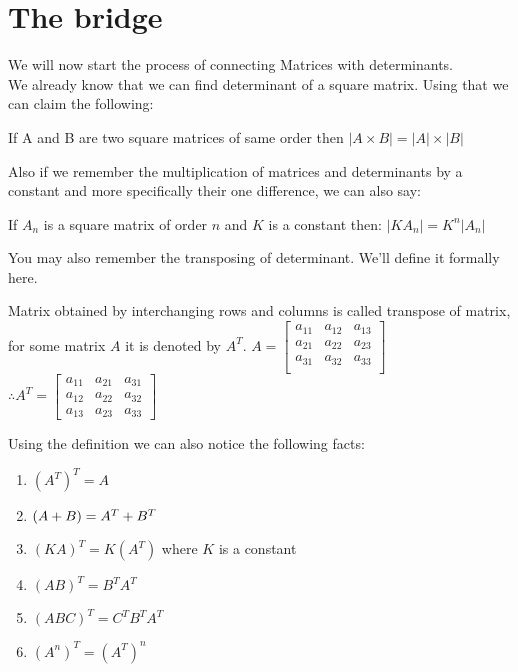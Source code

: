 \section{The bridge}
We will now start the process of connecting Matrices with determinants.\\
We already know that we can  find determinant of a square matrix. Using that we can claim the following:\\
\begin{theorem}
     If A and B are two square matrices of same order then $|A \times B| =|A| \times |B|$
\end{theorem}
Also if we remember the multiplication of matrices and determinants by a constant and more specifically their one difference, we can also say:\\
\begin{theorem}
If $A_n$ is a square matrix of order $n$ and $K$ is a constant then:
$|KA_n| = K^n|A_n|$
\end{theorem}
You may also remember the transposing of determinant. We'll define it formally here.
\begin{definition}
    Matrix obtained by interchanging rows and columns is called transpose of matrix, for some matrix $A$ it is denoted by $A^T$.
    $A = \begin{bmatrix}
        a_{11} &a_{12} &a_{13} \\
        a_{21} &a_{22} &a_{23} \\
        a_{31} &a_{32} &a_{33} \\
    \end{bmatrix}$\\
    $\therefore A^T= \begin{bmatrix}
        a_{11} &a_{21} &a_{31} \\
        a_{12} &a_{22} &a_{32} \\
        a_{13} &a_{23} &a_{33}
    \end{bmatrix}$
\end{definition}
Using the definition we can also notice the following facts:\\
\begin{theorem}
    \begin{enumerate}
        \item ${(A^T)}^T=A$\\
        \item $(A+B)=A^T + B^T\\$
        \item ${(KA)}^T=K(A^T)$ where $K$ is a constant\\
        \item ${(AB)}^T=B^TA^T$\\
        \item ${(ABC)^T}=C^TB^TA^T$\\
        \item ${(A^n)}^T={(A^T)}^n$
    \end{enumerate}
\end{theorem}
